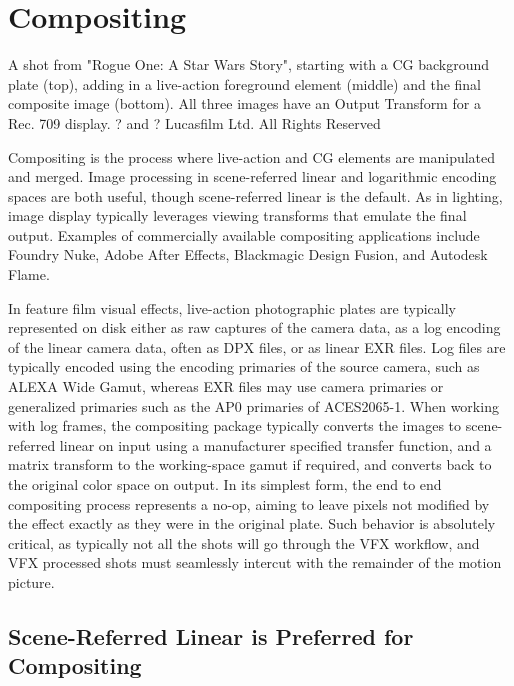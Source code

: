 \section{Compositing}%
\label{sec:compositing}




A shot from "Rogue One: A Star Wars Story", starting with a CG background plate (top), adding in a live-action foreground element (middle) and the final composite image (bottom). All three images have an Output Transform for a Rec. 709 display.
? and ? Lucasfilm Ltd. All Rights Reserved

Compositing is the process where live-action and CG elements are manipulated and merged. Image processing in scene-referred linear and logarithmic encoding spaces are both useful, though scene-referred linear is the default. As in lighting, image display typically leverages viewing transforms that emulate the final output. Examples of commercially available compositing applications include Foundry Nuke, Adobe After Effects, Blackmagic Design Fusion, and Autodesk Flame.

In feature film visual effects, live-action photographic plates are typically represented on disk either as raw captures of the camera data, as a log encoding of the linear camera data, often as DPX files, or as linear EXR files. Log files are typically encoded using the encoding primaries of the source camera, such as ALEXA Wide Gamut, whereas EXR files may use camera primaries or generalized primaries such as the AP0 primaries of ACES2065-1.  When working with log frames, the compositing package typically converts the images to scene-referred linear on input using a manufacturer specified transfer function, and a matrix transform to the working-space gamut if required, and converts back to the original color space on output. In its simplest form, the end to end compositing process represents a no-op, aiming to leave pixels not modified by the effect exactly as they were in the original plate. Such behavior is absolutely critical, as typically not all the shots will go through the VFX workflow, and VFX processed shots must seamlessly intercut with the remainder of the motion picture.

\subsection{Scene-Referred Linear is Preferred for Compositing}%
\label{subsec:scene-referred-linear-is-preferred-for-compositing}

